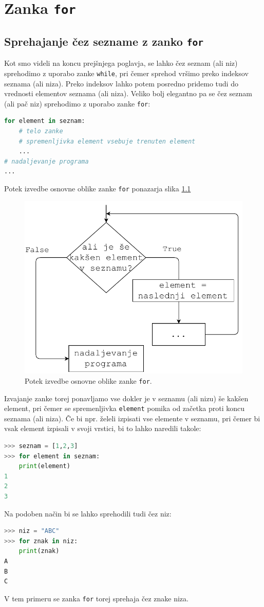 \chapter{Zanka \texttt{for}}

\section{Sprehajanje čez sezname z zanko \texttt{for}}
Kot smo videli na koncu prejšnjega poglavja, se lahko čez seznam (ali niz) sprehodimo z uporabo zanke \texttt{while}, pri čemer sprehod vršimo preko indeksov seznama (ali niza). Preko indeksov lahko potem posredno pridemo tudi do vrednosti elementov seznama (ali niza). Veliko bolj elegantno pa se čez seznam (ali pač niz) sprehodimo z uporabo zanke \texttt{for}:
\begin{lstlisting}[language=Python]
for element in seznam:
    # telo zanke
    # spremenljivka element vsebuje trenuten element
    ...
# nadaljevanje programa
...
\end{lstlisting}
Potek izvedbe osnovne oblike zanke \texttt{for} ponazarja slika \ref{img:for1}
\begin{figure}
    \centering
    \includegraphics[width=0.5\linewidth]{img/for1.pdf}
    \caption{Potek izvedbe osnovne oblike zanke \texttt{for}.}
    \label{img:for1}
\end{figure}
Izvajanje zanke torej ponavljamo vse dokler je v seznamu (ali nizu) še kakšen element, pri čemer se spremenljivka \texttt{element} pomika od začetka proti koncu seznama (ali niza). Če bi npr. želeli izpisati vse elemente v seznamu, pri čemer bi vsak element izpisali v svoji vrstici, bi to lahko naredili takole:
\begin{lstlisting}[language=Python]
>>> seznam = [1,2,3]
>>> for element in seznam:
	print(element)
1
2
3
\end{lstlisting}
Na podoben način bi se lahko sprehodili tudi čez niz:
\begin{lstlisting}[language=Python]
>>> niz = "ABC"
>>> for znak in niz:
	print(znak)
A
B
C
\end{lstlisting}
V tem primeru se zanka \texttt{for} torej sprehaja čez znake niza.

